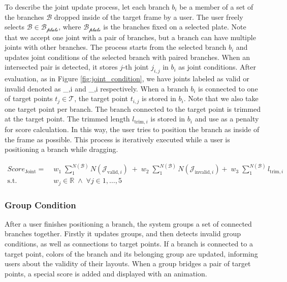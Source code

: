 To describe the joint update process, let each branch $b_i$ be a member of a set of the branches $\mathcal{B}$ dropped inside of the target frame by a user.
The user freely selects $\mathcal{B} \in \mathcal{B_\text{plate}}$, where $\mathcal{B_\text{plate}}$ is the branches fixed on a selected plate.
Note that we accept one joint with a pair of branches, but a branch can have multiple joints with other branches.
The process starts from the selected branch $b_i$ and updates joint conditions of the selected branch with paired branches.
When an intersected pair is detected, it stores $j$-th joint $j_{i, j}$ in $b_i$ as joint conditions.
After evaluation, as in Figure \ref{fig:joint_condition},  we have joints labeled as valid or invalid denoted as _{,i} and _{,i} respectively.
When a branch $b_i$ is connected to one of target points $t_j \in \mathcal{T}$, the target point $t_{i, j}$ is stored in $b_i$.
Note that we also take one target point per branch.
The branch connected to the target point is trimmed at the target point.
The trimmed length $l_{\text{trim}, i}$ is stored in $b_i$ and use as a penalty for score calculation.
In this way, the user tries to position the branch as inside of the frame as possible.
This process is iteratively executed while a user is positioning a branch while dragging.

\begin{equation}
 \begin{aligned}
 Score_{\text{Joint}} =  &\; w_1\;  \sum_{1}^{N(\mathcal{B})} N(\mathcal{J}_{\text{valid},i})\; +  \;w_2\; \sum_{1}^{N(\mathcal{B})} N(\mathcal{J}_{\text{invalid},i}) +
   \;w_3\; \sum_{1}^{N(\mathcal{B})} l_{\text{trim}, i}
 \\
   \textrm{s.t.} & \; w_j  \in \mathbb{R} \; \wedge \;   \forall j \in 1, \dotsc , 5
 \end{aligned}
 \label{eq:joint}
\end{equation}


\subsubsection{Group Condition}

After a user finishes positioning a branch, the system groups a set of connected branches together.
Firstly it updates groups, and then detects invalid group conditions, as well as connections to target points.
If a branch is connected to a target point, colors of the branch and its belonging group are updated, informing users about the validity of their layouts.
When a group bridges a pair of target points, a special score is added and displayed with an animation.

